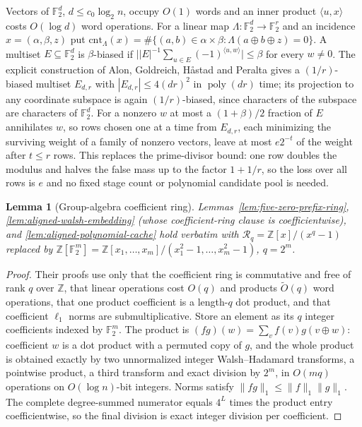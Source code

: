 \documentclass[11pt]{article}
\newtheorem{lemma}[theorem]{Lemma}
\newcommand{\softO}{\widetilde O}
\begin{document}
Vectors of $\mathbb F_2^d$, $d\le c_0\log_2n$, occupy $O(1)$ words and an
inner product $\langle u,x\rangle$ costs $O(\log d)$ word operations.  For
a linear map $\Lambda:\mathbb F_2^d\to\mathbb F_2^r$ and an incidence
$x=(\alpha,\beta,z)$ put
$\mathrm{cnt}_\Lambda(x)=\#\{(a,b)\in\alpha\times\beta:
\Lambda(a\oplus b\oplus z)=0\}$.  A multiset $E\subseteq\mathbb F_2^d$ is
$\beta$-biased if $\bigl||E|^{-1}\sum_{u\in E}(-1)^{\langle u,w\rangle}\bigr|
\le\beta$ for every $w\ne0$.  The explicit construction of Alon,
Goldreich, H\aa stad and Peralta gives a $(1/r)$-biased multiset
$E_{d,r}$ with $|E_{d,r}|\le4(dr)^2$ in $\operatorname{poly}(dr)$ time;
its projection to any coordinate subspace is again $(1/r)$-biased, since
characters of the subspace are characters of $\mathbb F_2^d$.  For a
nonzero $w$ at most a $(1+\beta)/2$ fraction of $E$ annihilates $w$, so
rows chosen one at a time from $E_{d,r}$, each minimizing the surviving
weight of a family of nonzero vectors, leave at most $e2^{-t}$ of the
weight after $t\le r$ rows.  This replaces the prime-divisor bound: one
row doubles the modulus and halves the false mass up to the factor
$1+1/r$, so the loss over all rows is $e$ and no fixed stage count or
polynomial candidate pool is needed.

\begin{lemma}[Group-algebra coefficient ring]
\label{lem:group-algebra-ring}
Lemmas~\ref{lem:five-zero-prefix-ring}, \ref{lem:aligned-walsh-embedding}
(whose coefficient-ring clause is coefficientwise), and
\ref{lem:aligned-polynomial-cache} hold verbatim with
$\mathcal R_q=\mathbb Z[x]/(x^q-1)$ replaced by
$\mathbb Z[\mathbb F_2^m]=\mathbb Z[x_1,\dots,x_m]/(x_1^2-1,\dots,x_m^2-1)$,
$q=2^m$.
\end{lemma}
\begin{proof}
Their proofs use only that the coefficient ring is commutative and free
of rank $q$ over $\mathbb Z$, that linear operations cost $O(q)$ and
products $\softO(q)$ word operations, that one product coefficient is a
length-$q$ dot product, and that coefficient $\ell_1$ norms are
submultiplicative.  Store an element as its $q$ integer coefficients
indexed by $\mathbb F_2^m$.  The product is
$(fg)(w)=\sum_vf(v)g(v\oplus w)$: coefficient $w$ is a dot product with a
permuted copy of $g$, and the whole product is obtained exactly by two
unnormalized integer Walsh--Hadamard transforms, a pointwise product, a
third transform and exact division by $2^m$, in $O(mq)$ operations on
$O(\log n)$-bit integers.  Norms satisfy $\|fg\|_1\le\|f\|_1\|g\|_1$.
The complete degree-summed numerator equals $4^L$ times the product
entry coefficientwise, so the final division is exact integer division
per coefficient.
\end{proof}
\end{document}
